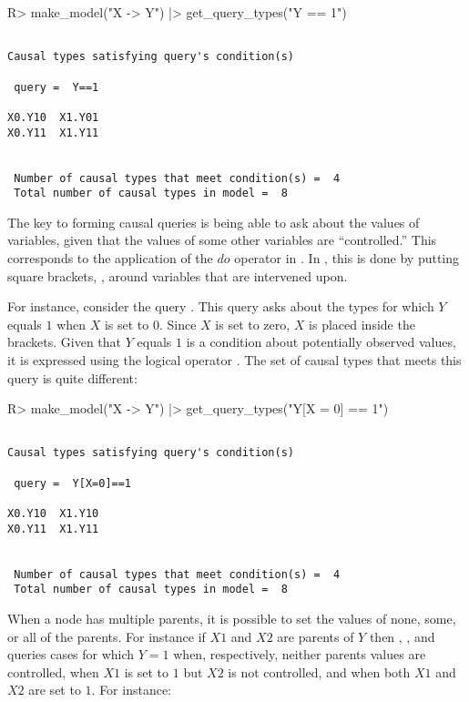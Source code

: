 \documentclass[
  11pt,
  article]{jss}
\renewcommand{\texttt}[1]{\code{#1}}
\begin{document}
\begin{CodeInput}
R> make_model("X -> Y")  |> get_query_types("Y == 1")
\end{CodeInput}

\begin{verbatim}

Causal types satisfying query's condition(s)  

 query =  Y==1 

X0.Y10  X1.Y01
X0.Y11  X1.Y11


 Number of causal types that meet condition(s) =  4
 Total number of causal types in model =  8
\end{verbatim}

The key to forming causal queries is being able to ask about the values
of variables, given that the values of some other variables are
``controlled.'' This corresponds to the application of the \(do\)
operator in \citet{pearl_causality_2009}. In , this
is done by putting square brackets, \texttt{{[}\ {]}}, around variables
that are intervened upon.

For instance, consider the query \texttt{Y{[}X\ =\ 0{]}\ ==\ 1}. This
query asks about the types for which \(Y\) equals \(1\) when \(X\) is
set to \(0\). Since \(X\) is set to zero, \(X\) is placed inside the
brackets. Given that \(Y\) equals \(1\) is a condition about potentially
observed values, it is expressed using the logical operator \texttt{==}.
The set of causal types that meets this query is quite different:

\begin{CodeInput}
R> make_model("X -> Y") |> get_query_types("Y[X = 0] == 1")
\end{CodeInput}

\begin{verbatim}

Causal types satisfying query's condition(s)  

 query =  Y[X=0]==1 

X0.Y10  X1.Y10
X0.Y11  X1.Y11


 Number of causal types that meet condition(s) =  4
 Total number of causal types in model =  8
\end{verbatim}

When a node has multiple parents, it is possible to set the values of
none, some, or all of the parents. For instance if \(X1\) and \(X2\) are
parents of \(Y\) then \texttt{Y\ ==\ 1},
\texttt{Y{[}X1\ =\ 1{]}\ ==\ 1}, and
\texttt{Y{[}X1\ =\ 1,\ X2\ =\ 1{]}\ ==\ 1} queries cases for which
\(Y=1\) when, respectively, neither parents values are controlled, when
\(X1\) is set to \(1\) but \(X2\) is not controlled, and when both
\(X1\) and \(X2\) are set to \(1\). For instance:
\end{document}
